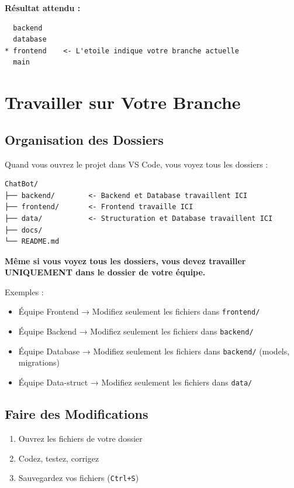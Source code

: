 \documentclass[11pt,a4paper]{article}
\begin{document}
\textbf{Résultat attendu :}
\begin{lstlisting}
  backend
  database
* frontend    <- L'etoile indique votre branche actuelle
  main
\end{lstlisting}

\clearpage

\section{Travailler sur Votre Branche}
\label{sec:travailler}

\subsection{Organisation des Dossiers}

Quand vous ouvrez le projet dans VS Code, vous voyez tous les dossiers :

\begin{lstlisting}
ChatBot/
├── backend/        <- Backend et Database travaillent ICI
├── frontend/       <- Frontend travaille ICI
├── data/           <- Structuration et Database travaillent ICI
├── docs/
└── README.md
\end{lstlisting}

\begin{important}
\textbf{Même si vous voyez tous les dossiers, vous devez travailler UNIQUEMENT dans le dossier de votre équipe.}

\vspace{0.3cm}
Exemples :
\begin{itemize}
    \item Équipe Frontend → Modifiez seulement les fichiers dans \texttt{frontend/}
    \item Équipe Backend → Modifiez seulement les fichiers dans \texttt{backend/}
    \item Équipe Database → Modifiez seulement les fichiers dans \texttt{backend/} (models, migrations)
    \item Équipe Data-struct → Modifiez seulement les fichiers dans \texttt{data/}
\end{itemize}
\end{important}

\subsection{Faire des Modifications}

\begin{enumerate}
    \item Ouvrez les fichiers de votre dossier
    \item Codez, testez, corrigez
    \item Sauvegardez vos fichiers (\texttt{Ctrl+S})
\end{enumerate}
\end{document}
